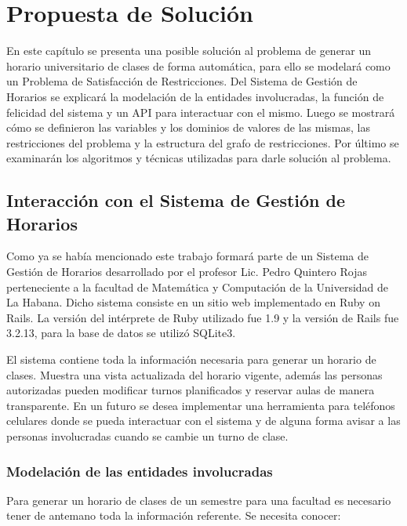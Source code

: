 \chapter{Propuesta de Solución}

En este cap\'itulo se presenta una posible soluci\'on al problema de generar un horario universitario de clases de forma autom\'atica, para ello se modelar\'a como un Problema de Satisfacci\'on de Restricciones. Del Sistema de Gesti\'on de Horarios se explicar\'a la modelaci\'on de la entidades involucradas, la funci\'on de felicidad del sistema y un API para interactuar con el mismo. Luego se mostrar\'a c\'omo se definieron las variables y los dominios de valores de las mismas, las restricciones del problema y la estructura del grafo de restricciones. Por \'ultimo se examinar\'an los algoritmos y t\'ecnicas utilizadas para darle soluci\'on al problema.

\section{Interacci\'on con el Sistema de Gesti\'on de Horarios}

Como ya se hab\'ia mencionado este trabajo formar\'a parte de un Sistema de Gesti\'on de Horarios desarrollado por el profesor Lic. Pedro Quintero Rojas perteneciente a la facultad de Matem\'atica y Computaci\'on de la Universidad de La Habana. Dicho sistema consiste en un sitio web implementado en Ruby on Rails. La versi\'on del int\'erprete de Ruby utilizado fue 1.9 y la versi\'on de Rails fue 3.2.13, para la base de datos se utiliz\'o SQLite3.

El sistema contiene toda la informaci\'on necesaria para generar un horario de clases. Muestra una vista actualizada del horario vigente, adem\'as las personas autorizadas pueden modificar turnos planificados y reservar aulas de manera transparente. En un futuro se desea implementar una herramienta para tel\'efonos celulares donde se pueda interactuar con el sistema y de alguna forma avisar a las personas involucradas cuando se cambie un turno de clase. 

\subsection{Modelaci\'on de las entidades involucradas}

Para generar un horario de clases de un semestre para una facultad es necesario tener de antemano toda la informaci\'on referente. Se necesita conocer:

